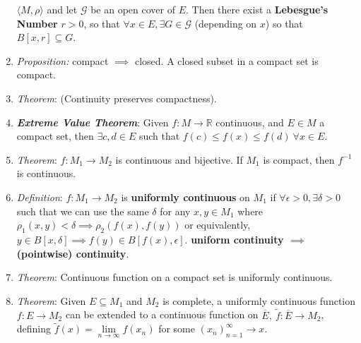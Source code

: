 \documentclass[10pt]{article}
\newcommand{\seqn}[1]{(#1)^\infty_{n=1}}
\newcommand{\real}{\mathbb{R}}
\begin{document}
\begin{multicols*}{3}
\begin{enumerate}
		      \(\langle M,\rho\rangle\) and let \(\mathcal{G}\) be an open cover of \(E\).
		      Then there exist a \textbf{Lebesgue's Number} \(r>0\), so that \(\forall x\in E,
		      \exists G\in\mathcal{G}\) (depending on \(x\)) so that \(B[x,r]\subseteq G\).
		\item \emph{Proposition:} compact \(\implies\) closed. A closed subset in a compact set
		      is compact.
		\item \emph{Theorem}: (Continuity preserves compactness).
		\item \emph{\textbf{Extreme Value Theorem}}: Given $f:M\to\real$ continuous,
		and $E\in M$ a compact set, then $\exists c,d\in E$ such that
		$f(c)\leq f(x)\leq f(d)\ \forall x\in E$.
		\item \emph{Theorem}: $f:M_{1}\to M_{2}$ is continuous and bijective. If
		$M_{1}$ is compact, then $f^{-1}$ is continuous.
		\item \emph{Definition}: $f:M_{1}\to M_{2}$ is \textbf{uniformly continuous}
		on $M_{1}$ if $\forall\epsilon>0,\exists\delta>0$ such that we can use the
		same $\delta$ for any $x,y\in M_{1}$ where
		$\rho_{1}(x,y)<\delta\implies\rho_{2}(f(x),f(y))$ or equivalently,
		$y\in B[x,\delta]\implies f(y)\in B[f(x),\epsilon]$. \textbf{uniform
			continuity $\implies$ (pointwise) continuity}.
		\item \emph{Theorem}: Continuous function on a compact set is uniformly continuous.
		\item \emph{Theorem}: Given $E\subseteq M_{1}$ and $M_{2}$ is complete, a
			uniformly continuous function $f:E\to M_{2}$ can be extended to a
			continuous function on $\overline{E},\ \tilde{f}:\overline{E}\to M_{2}$,
			defining $\tilde{f}(x)=\lim\limits_{n\to\infty}f(x_{n})$ for some
			$\seqn{x_{n}}\to x$.
	\end{enumerate}


\end{multicols*}
\end{document}
